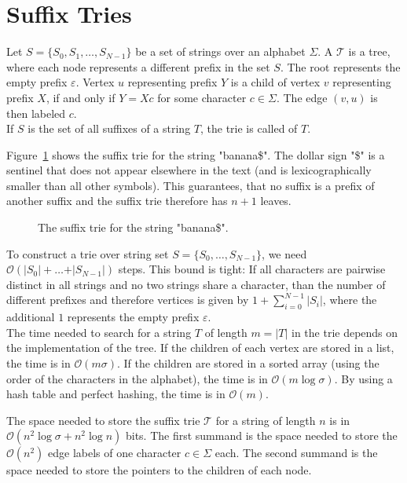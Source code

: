 \section{Suffix Tries}

\begin{Definition}
  Let $S = \{S_0, S_1, \ldots, S_{N-1}\}$ be a set of strings over an alphabet $\Sigma$. A  $\mathcal{T}$ is a tree, where each node represents a different prefix in the set $S$. The root represents the empty prefix $\varepsilon$. Vertex $u$ representing prefix $Y$ is a child of vertex $v$ representing prefix $X$, if and only if $Y = Xc$ for some character $c \in \Sigma$. The edge $(v,u)$ is then labeled $c$.\\
  If $S$ is the set of all suffixes of a string $T$, the trie is called  of $T$.
\end{Definition}

\begin{Example}
  Figure~\ref{fig:suffixTrieExample} shows the suffix trie for the string "banana\$". The dollar sign "\$" is a sentinel that does not appear elsewhere in the text (and is lexicographically smaller than all other symbols). This guarantees, that no suffix is a prefix of another suffix and the suffix trie therefore has $n+1$ leaves.
  \begin{figure}[htb]
    \centering
    
    \caption{The suffix trie for the string "banana\$".}
    \label{fig:suffixTrieExample}
  \end{figure}
\end{Example}

To construct a trie over string set $S = \{S_0, \ldots, S_{N-1}\}$, we need $\mathcal{O}(\vert S_0 \vert + \ldots + \vert S_{N-1} \vert)$ steps. This bound is tight: If all characters are pairwise distinct in all strings and no two strings share a character, than the number of different prefixes and therefore vertices is given by $1 + \sum_{i=0}^{N-1} \vert S_i \vert$, where the additional $1$ represents the empty prefix $\varepsilon$.\\
The time needed to search for a string $T$ of length $m = \vert T \vert$ in the trie depends on the implementation of the tree. If the children of each vertex are stored in a list, the time is in $\mathcal{O}(m\sigma)$. If the children are stored in a sorted array (using the order of the characters in the alphabet), the time is in $\mathcal{O}(m\log \sigma)$. By using a hash table and perfect hashing, the time is in $\mathcal{O}(m)$.

The space needed to store the suffix trie $\mathcal{T}$ for a string of length $n$ is in $\mathcal{O}{(n^2\log \sigma + n^2\log n)}$ bits. The first summand is the space needed to store the $\mathcal{O}(n^2)$ edge labels of one character $c \in \Sigma$ each. The second summand is the space needed to store the pointers to the children of each node.

